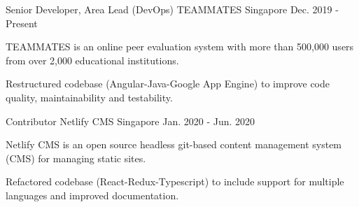 

\begin{cventries}

  \cventry
    {Senior Developer, Area Lead (DevOps)} %
    {TEAMMATES} %
    {Singapore} %
    {Dec. 2019 - Present} %
    {
      \begin{cvitems} %
        \item {TEAMMATES is an online peer evaluation system with more than 500,000 users from over 2,000 educational institutions.}
        \item {Restructured codebase (Angular-Java-Google App Engine) to improve code quality, maintainability and testability.}
      \end{cvitems}
    }

  \cventry
  {Contributor} %
  {Netlify CMS} %
  {Singapore} %
  {Jan. 2020 - Jun. 2020} %
  {
    \begin{cvitems} %
      \item {Netlify CMS is an open source headless git-based content management system (CMS) for managing static sites.}
      \item {Refactored codebase (React-Redux-Typescript) to include support for multiple languages and improved documentation.}
    \end{cvitems}
  }

\end{cventries}
